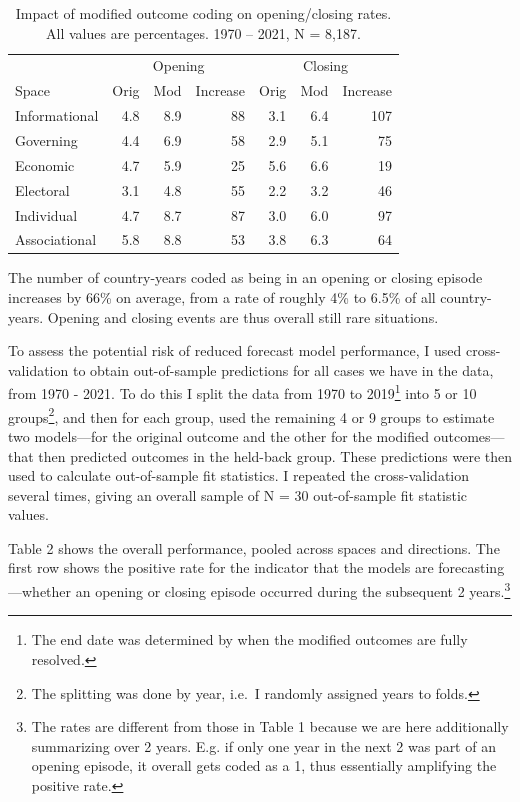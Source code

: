 \documentclass[
  11pt,
]{article}
\begin{document}
\begin{table}
\centering
\caption{Impact of modified outcome coding on opening/closing rates. All values are percentages. 1970 – 2021, N = 8,187.\label{tab:positive-rates}}
\begin{tabular}[t]{lrrrrrr}
\toprule
\multicolumn{1}{c}{} & \multicolumn{3}{c}{Opening} & \multicolumn{3}{c}{Closing} \\
\cmidrule(l{3pt}r{3pt}){2-4} \cmidrule(l{3pt}r{3pt}){5-7}
Space & Orig & Mod & Increase & Orig & Mod & Increase\\
\midrule
Informational & 4.8 & 8.9 & 88 & 3.1 & 6.4 & 107\\
Governing & 4.4 & 6.9 & 58 & 2.9 & 5.1 & 75\\
Economic & 4.7 & 5.9 & 25 & 5.6 & 6.6 & 19\\
Electoral & 3.1 & 4.8 & 55 & 2.2 & 3.2 & 46\\
Individual & 4.7 & 8.7 & 87 & 3.0 & 6.0 & 97\\
\addlinespace
Associational & 5.8 & 8.8 & 53 & 3.8 & 6.3 & 64\\
\bottomrule
\end{tabular}
\end{table}

The number of country-years coded as being in an opening or closing
episode increases by 66\% on average, from a rate of roughly 4\% to
6.5\% of all country-years. Opening and closing events are thus overall
still rare situations.

To assess the potential risk of reduced forecast model performance, I
used cross-validation to obtain out-of-sample predictions for all cases
we have in the data, from 1970 - 2021. To do this I split the data from
1970 to 2019\footnote{The end date was determined by when the modified
  outcomes are fully resolved.} into 5 or 10 groups\footnote{The
  splitting was done by year, i.e.~I randomly assigned years to folds.},
and then for each group, used the remaining 4 or 9 groups to estimate
two models---for the original outcome and the other for the modified
outcomes---that then predicted outcomes in the held-back group. These
predictions were then used to calculate out-of-sample fit statistics. I
repeated the cross-validation several times, giving an overall sample of
N = 30 out-of-sample fit statistic values.

Table 2 shows the overall performance, pooled across spaces and
directions. The first row shows the positive rate for the indicator that
the models are forecasting---whether an opening or closing episode
occurred during the subsequent 2 years.\footnote{The rates are different
  from those in Table 1 because we are here additionally summarizing
  over 2 years. E.g. if only one year in the next 2 was part of an
  opening episode, it overall gets coded as a 1, thus essentially
  amplifying the positive rate.}
\end{document}
